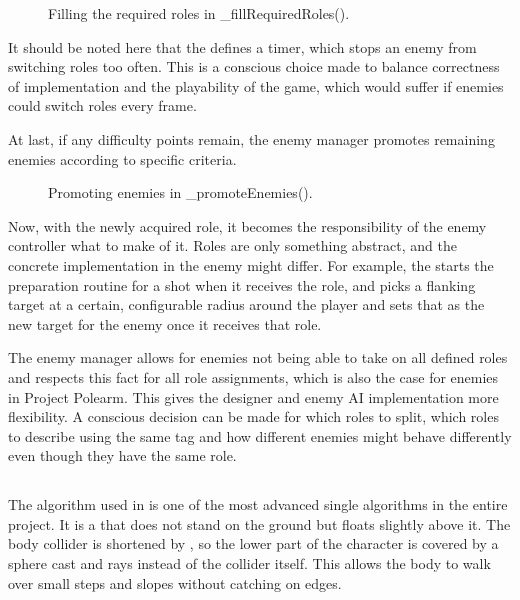 \documentclass[../Main.tex]{subfiles}
\begin{document}
\begin{figure}[H]
    \centering
    
    \caption[Filling the required roles in \_fillRequiredRoles(). Own figure.]{Filling the required roles in \_fillRequiredRoles().}
    \label{fig:roles-required}
\end{figure}

It should be noted here that the  defines a timer, which stops an enemy from switching roles too often. This is a conscious choice made to balance correctness of implementation and the playability of the game, which would suffer if enemies could switch roles every frame.

At last, if any difficulty points remain, the enemy manager promotes remaining enemies according to specific criteria.

\begin{figure}[H]
    \centering
    
    \caption[Promoting enemies in \_promoteEnemies(). Own figure.]{Promoting enemies in \_promoteEnemies().}
    \label{fig:roles-promote}
\end{figure}

Now, with the newly acquired role, it becomes the responsibility of the enemy controller what to make of it. Roles are only something abstract, and the concrete implementation in the enemy might differ. For example, the  starts the preparation routine for a shot when it receives the  role, and  picks a flanking target at a certain, configurable radius around the player and sets that as the new target for the enemy once it receives that role.

The enemy manager allows for enemies not being able to take on all defined roles and respects this fact for all role assignments, which is also the case for enemies in Project Polearm. This gives the designer and enemy AI implementation more flexibility. A conscious decision can be made for which roles to split, which roles to describe using the same tag and how different enemies might behave differently even though they have the same role.

\subsection{}\label{sec:floatingbody}

The algorithm used in  is one of the most advanced single algorithms in the entire project. It is a  that does not stand on the ground but floats slightly above it. The body collider is shortened by , so the lower part of the character is covered by a sphere cast and rays instead of the collider itself. This allows the body to walk over small steps and slopes without catching on edges.
\end{document}
